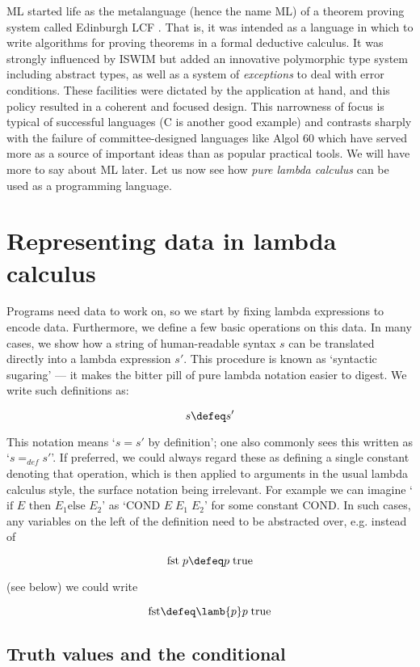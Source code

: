 ML started life as the metalanguage (hence the name ML) of a theorem proving
system called Edinburgh LCF \cite{gordon-lcfbook}. That is, it was intended as
a language in which to write algorithms for proving theorems in a formal
deductive calculus. It was strongly influenced by ISWIM but added an innovative
polymorphic type system including abstract types, as well as a system of {\em
exceptions} to deal with error conditions. These facilities were dictated by
the application at hand, and this policy resulted in a coherent and focused
design. This narrowness of focus is typical of successful languages (C is
another good example) and contrasts sharply with the failure of
committee-designed languages like Algol 60 which have served more as a source
of important ideas than as popular practical tools. We will have more to say
about ML later. Let us now see how {\em pure lambda calculus} can be used as a
programming language.

\section{Representing data in lambda calculus}

Programs need data to work on, so we start by fixing lambda expressions to
encode data. Furthermore, we define a few basic operations on this data. In
many cases, we show how a string of human-readable syntax $s$ can be translated
directly into a lambda expression $s'$. This procedure is known as `syntactic
sugaring' --- it makes the bitter pill of pure lambda notation easier to
digest. We write such definitions as:

$$ s \defeq s' $$

This notation means `$s = s'$ by definition'; one also commonly sees this
written as `$s =_{def} s'$'. If preferred, we could always regard these as
defining a single constant denoting that operation, which is then applied to
arguments in the usual lambda calculus style, the surface notation being
irrelevant. For example we can imagine `$\mbox{if } E \mbox{ then } E_1 \mbox{
else } E_2$' as `$\mbox{COND } E\; E_1\; E_2$' for some constant $\mbox{COND}$.
In such cases, any variables on the left of the definition need to be
abstracted over, e.g. instead of

$$ \mbox{fst}\; p \defeq p\; \mbox{true} $$

\noindent (see below) we could write

$$ \mbox{fst} \defeq \lamb{p} p\; \mbox{true} $$

\subsection{Truth values and the conditional}


